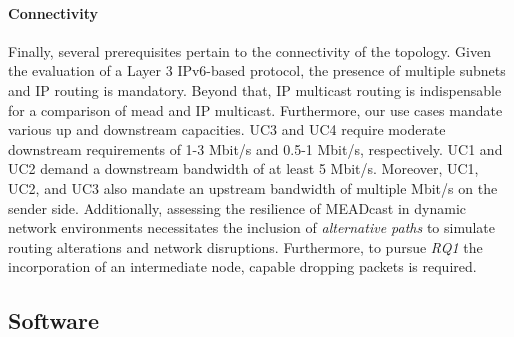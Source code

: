 \paragraph{Connectivity} %
\label{par:Connectivity}
Finally, several prerequisites pertain to the connectivity of the topology.
Given the evaluation of a Layer 3 IPv6-based protocol, the presence of multiple
    subnets and IP routing is mandatory.
Beyond that, IP multicast routing is indispensable for a comparison of \gls{mead}
    and IP multicast.
Furthermore, our use cases mandate various up and downstream capacities.
UC3 and UC4 require moderate downstream requirements of 1-3 Mbit/s and 0.5-1
    Mbit/s, respectively.
UC1 and UC2 demand a downstream bandwidth of at least 5 Mbit/s.
Moreover, UC1, UC2, and UC3 also mandate an upstream bandwidth of multiple
    Mbit/s on the sender side.
Additionally, assessing the resilience of MEADcast in dynamic network
    environments necessitates the inclusion of \textit{alternative paths} to
    simulate routing alterations and network disruptions.
Furthermore, to pursue \textit{RQ1} the incorporation of an intermediate node,
    capable dropping packets is required.



\subsection{Software} %
\label{sub:Software}
\label{sub:Requirements}

